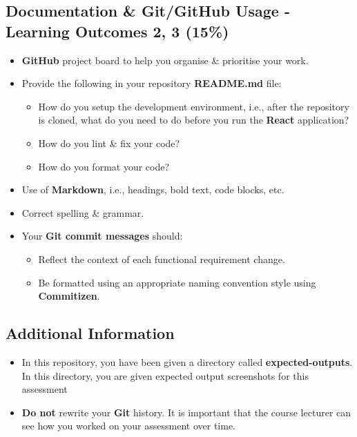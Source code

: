 \documentclass{article}
\begin{document}
\subsection*{Documentation \& Git/GitHub Usage - Learning Outcomes 2, 3 (15\%)}
\begin{itemize}
	\item \textbf{GitHub} project board to help you organise \& prioritise your work. 
	\item Provide the following in your repository \textbf{README.md} file:
	\begin{itemize}
		\item How do you setup the development environment, i.e., after the repository is cloned, what do you need to do before you run the \textbf{React} application?
		\item How do you lint \& fix your code?
		\item How do you format your code?
	\end{itemize}
	\item Use of \textbf{Markdown}, i.e., headings, bold text, code blocks, etc.
	\item Correct spelling \& grammar. 
	\item Your \textbf{Git commit messages} should:
	\begin{itemize}
		\item Reflect the context of each functional requirement change.
		\item Be formatted using an appropriate naming convention style using \textbf{Commitizen}.
	\end{itemize}	
\end{itemize}

\subsection*{Additional Information}
\begin{itemize}
	\item In this repository, you have been given a directory called \textbf{expected-outputs}. In this directory, you are given expected output screenshots for this assessment
	\item \textbf{Do not} rewrite your \textbf{Git} history. It is important that the course lecturer can see how you worked on your assessment over time.
\end{itemize}
\end{document}
